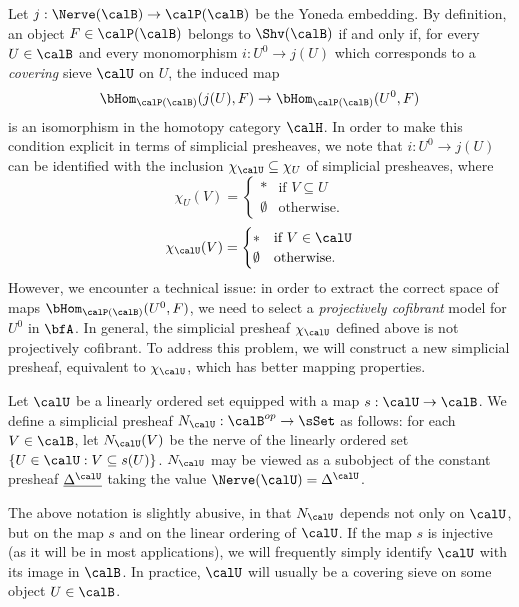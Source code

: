 Let $j: \Nerve(\calB) \rightarrow \calP(\calB)$ be the Yoneda embedding. By definition, an object
$F \in \calP(\calB)$ belongs to $\Shv(\calB)$ if and only if, for every $U \in \calB$ and every
monomorphism $i: U^{0} \rightarrow j(U)$ which corresponds to a {\em covering} sieve $\calU$ on $U$, the induced map
$$ \bHom_{ \calP(\calB)}( j(U), F) \rightarrow \bHom_{ \calP(\calB)}( U^0, F)$$
is an isomorphism in the homotopy category $\calH$. In order to make this condition explicit
in terms of simplicial presheaves, we note that $i: U^{0} \rightarrow j(U)$ can be identified with the inclusion $\chi_{\calU} \subseteq \chi_{U}$ of simplicial presheaves, where
$$\chi_{U}(V) = \begin{cases} \ast & \text{if } V \subseteq U \\
\emptyset & \text{otherwise.} \end{cases}$$
$$\chi_{\calU}(V) = \begin{cases} \ast & \text{if } V \in \calU \\
\emptyset & \text{otherwise.} \end{cases}$$
However, we encounter a technical issue: in order to extract the correct space of maps
$\bHom_{\calP(\calB)}( U^0, F)$, we need to select a {\em projectively cofibrant} model for $U^0$ in $\bfA$. In general, the simplicial presheaf $\chi_{\calU}$ defined above is not projectively cofibrant.
To address this problem, we will construct a new simplicial presheaf, equivalent to $\chi_{\calU}$, which has better mapping properties.

\begin{definition}
Let $\calU$ be a linearly ordered set equipped with a map $s: \calU \rightarrow \calB$.
We define a simplicial presheaf $N_{\calU}: \calB^{op} \rightarrow \sSet$ as follows: for each $V \in \calB$, let $N_{\calU}(V)$ be the nerve of the linearly ordered set $\{ U \in \calU: V \subseteq s(U) \}$. 
$N_{\calU}$ may be viewed as a subobject of the constant presheaf $\underline{ \Delta^{\calU} }$ taking the value $\Nerve(\calU) = \Delta^{\calU}$. 
\end{definition}

\begin{remark}
The above notation is slightly abusive, in that $N_{\calU}$ depends not only on $\calU$, but on the map $s$ and on the linear ordering of $\calU$.  If the map $s$ is injective (as it will be in most applications), we will frequently simply identify $\calU$ with its image in $\calB$. In practice, $\calU$ will usually be a covering sieve on some object $U \in \calB$.
\end{remark}

